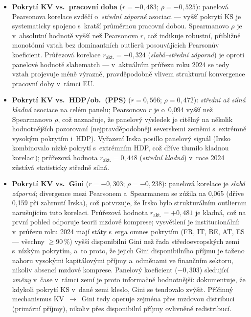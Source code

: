 \begin{itemize}
  \item \textbf{Pokrytí \ac{KV} vs.~pracovní doba} ($r = -0{,}483$; $\rho = -0{,}525$):
    panelová Pearsonova korelace svděčí o~\emph{střední záporné} asociaci --- vyšší pokrytí \ac{KS} je systematicky spojeno s~kratší průměrnou pracovní dobou.
    Spearmanovo $\rho$ je v~absolutní hodnotě vyšší než Pearsonovo $r$, což indikuje robustní, přibližně monotónní vztah bez dominantních outlierů posouvájících Pearsonův koeficient.
    Průřezová korelace $r_{\text{akt.}} = -0{,}324$ (\emph{slabá--střední záporná}) je oproti panelové hodnotě slabematch --- v~aktuálním průřezu roku 2024 se tedy vztah projevuje méně výrazně, pravděpodobně vlivem strukturní konvergence pracovní doby v~rámci EU.

  \item \textbf{Pokrytí \ac{KV} vs.~\ac{HDP}/ob.~(\ac{PPS})} ($r = 0{,}566$; $\rho = 0{,}472$):
    \emph{střední až silná kladná} asociace na celém panelu; Pearsonovo $r$ je o~0,094 vyšší než Spearmanovo $\rho$, což naznačuje, že panelový výsledek je citělný na několik hodnotnějších pozorovaní (nejpravděpodobněji severskemi zeměmi s~extrémně vysokým pokrytím i~\ac{HDP}).
    Vyřazení Irska posillo panelový signál (Irsko kombinovalo nízké pokrytí s~extrémním \ac{HDP}, což dříve tlumilo kladnou korelaci); průřezová hodnota $r_{\text{akt.}} = 0{,}448$ (\emph{střední kladná}) v~roce 2024 zůstává statisticky středně silná.

  \item \textbf{Pokrytí \ac{KV} vs.~Gini} ($r = -0{,}303$; $\rho = -0{,}238$):
    panelová korelace je \emph{slabá záporná}; divergence mezi Pearsonem a~Spearmanem se zúžila na 0,065 (dříve 0,159 při zahrnutí Irska), což potvrzuje, že Irsko bylo strukturálním outliernm narušujícím tuto korelaci.
    Průřezová hodnota $r_{\text{akt.}} = +0{,}481$ je kladná, což na první pohled odporuje teorii mzdové komprese; vysvětlení je institucionální: v~průřezu roku 2024 mají státy s~erga omnes pokrytím (FR, IT, BE, AT, ES --- všechny $\geq 90\,\%$) vyšší disponibilní Gini než řada středoevropských zemí s~nízkým pokrytím, a~to proto, že jejich Gini disponibilního příjmu je taženo nahoru vysokými kapitálovými příjmy a~odměnami ve finančním sektoru, nikoliv absencí mzdové komprese.
    Panelový koeficient ($-0{,}303$) sledující \emph{změny} v~čase v~rámci zemí je proto informačně hodnotnější: dokumentuje, že kdykoli pokrytí \ac{KS} v~dané zemi kleslo, Gini se tendovalo zvýšit.
    Příčinný mechanismus KV~$\to$~Gini tedy operuje zejména přes mzdovou distribuci (primární příjmy), nikoliv přes disponibilní příjmy ovlivněné redistribucí.


\end{itemize}
